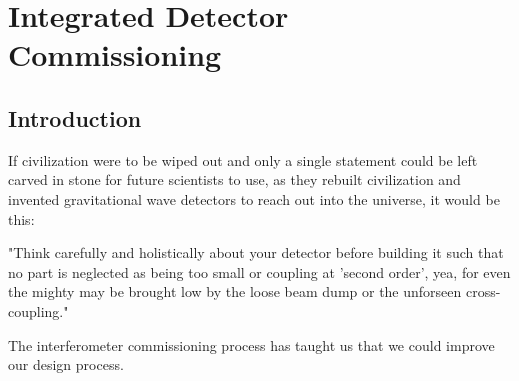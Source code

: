 \chapter[Integrated Detector Commissioning]{Integrated Detector Commissioning}
\label{IDC}




%
%
%


\section{Introduction}
\label{sec7.1}
If civilization were to be wiped out and only a single statement could be left
carved in stone for future scientists to use, as they rebuilt civilization and
invented gravitational wave detectors to reach out into the universe,
it would be this:

"Think carefully and holistically about your detector before building it
such that no part is neglected as being too small or  coupling at 'second order',
yea, for even the mighty may be brought low by the loose beam dump or the
unforseen cross-coupling."

The interferometer commissioning process has taught us that we could improve
our design process.

